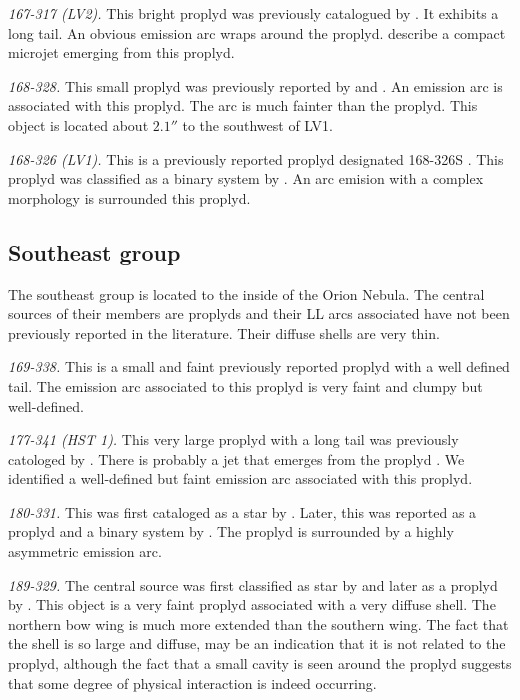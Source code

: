 \documentclass[iop, apj]{emulateapj}
\renewcommand\clearpage{}
\begin{document}
\textit{167-317 (LV2).} This bright proplyd was previously catalogued by \citet{ODell:1994a, Ricci:2008a}. It exhibits a long tail. An obvious emission arc \citep{Bally:2000a} wraps around the proplyd. \citet{Bally:2000a} describe a compact microjet emerging from this proplyd. 

\textit{168-328.} This small proplyd was previously reported by \citet{ODell:1994a} and \citet{Ricci:2008a}. An emission arc is associated with this proplyd. The arc is much fainter than the proplyd. This object is located about \(2.1''\) to the southwest of LV1.  

\textit{168-326 (LV1).} This is a previously reported proplyd  designated 168-326S \citep{ODell:1994a}. This proplyd was classified as a binary system by \citet{Ricci:2008a}. An arc emision with a complex morphology is surrounded this proplyd.


\clearpage
\subsection{Southeast group}
\label{sec:se-group}



The southeast group is located to the inside of the Orion Nebula. The central sources of their members are proplyds and their LL arcs associated have not been previously reported in the literature. Their diffuse shells are very thin. 

\textit{169-338.} This is a small and faint previously reported proplyd \citep{ODell:1994a, Ricci:2008a} with a well defined tail. The emission arc associated to this proplyd is very faint and clumpy but well-defined. 

\textit{177-341 (HST 1).} This very large proplyd with a long tail was
previously catologed by \citet{ODell:1994a, Ricci:2008a}. There is probably a jet that emerges from the proplyd \citep{Bally:2000a}. We identified a well-defined but faint  emission arc associated with this proplyd.

\textit{180-331.} This was first cataloged as a star by \citet{ODell:1996a}. Later, this was reported as a proplyd and a binary system by \citet{Ricci:2008a}. The proplyd is surrounded by a highly asymmetric emission arc.

\textit{189-329.}  The central source was first classified as star by \citet{ODell:1996a} and later as a proplyd by \citet{Ricci:2008a}. This object is a very faint proplyd associated with a very diffuse shell. The northern bow wing is much more extended than the southern wing. The fact that the shell is so large and diffuse, may be an indication that it is not related to the proplyd, although the fact that a small cavity is seen  around the proplyd suggests that some degree of physical interaction is indeed occurring.
\end{document}
